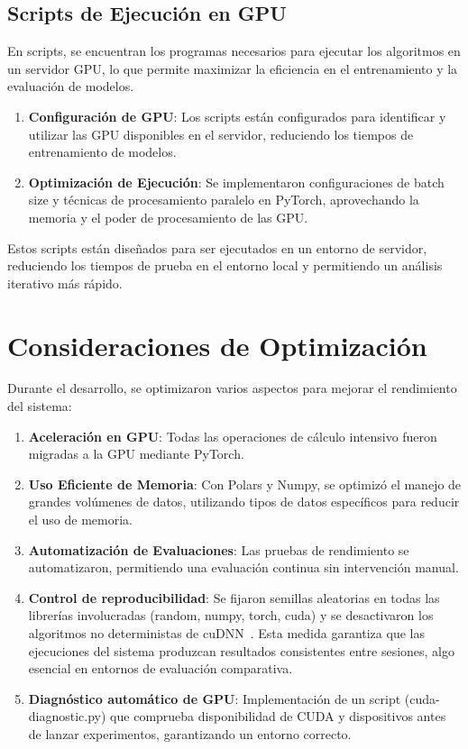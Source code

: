 \subsection{Scripts de Ejecución en GPU}\label{subsec:scripts-de-ejecucion-en-gpu}
En scripts, se encuentran los programas necesarios para ejecutar los algoritmos en un servidor GPU, lo que permite
maximizar la eficiencia en el entrenamiento y la evaluación de modelos.
\begin{enumerate}
      \item \textbf{Configuración de GPU}: Los scripts están configurados para identificar y utilizar las GPU disponibles
            en el servidor, reduciendo los tiempos de entrenamiento de modelos.
      \item \textbf{Optimización de Ejecución}: Se implementaron configuraciones de batch size y técnicas de
            procesamiento paralelo en PyTorch, aprovechando la memoria y el poder de procesamiento de las GPU\@.
\end{enumerate}

Estos scripts están diseñados para ser ejecutados en un entorno de servidor, reduciendo los tiempos de prueba en el
entorno local y permitiendo un análisis iterativo más rápido.

\section{Consideraciones de Optimización}\label{sec:consideraciones-de-optimizacion}
Durante el desarrollo, se optimizaron varios aspectos para mejorar el rendimiento del sistema:

\begin{enumerate}
      \item \textbf{Aceleración en GPU}: Todas las operaciones de cálculo intensivo fueron migradas a la GPU mediante
            PyTorch.
      \item \textbf{Uso Eficiente de Memoria}: Con Polars y Numpy, se optimizó el manejo de grandes volúmenes de datos,
            utilizando tipos de datos específicos para reducir el uso de memoria.
      \item \textbf{Automatización de Evaluaciones}: Las pruebas de rendimiento se automatizaron, permitiendo una
            evaluación continua sin intervención manual.
      \item \textbf{Control de reproducibilidad}: Se fijaron semillas aleatorias en todas las librerías involucradas
            (random, numpy, torch, cuda) y se desactivaron los algoritmos no deterministas de cuDNN~\cite{CuBLASDeterministicAlgorithms}.
            Esta medida garantiza que las ejecuciones del sistema produzcan resultados consistentes entre sesiones,
            algo esencial en entornos de evaluación comparativa.
      \item \textbf{Diagnóstico automático de GPU}: Implementación de un script (cuda-diagnostic.py) que comprueba disponibilidad
            de CUDA y dispositivos antes de lanzar experimentos, garantizando un entorno correcto.
\end{enumerate}


